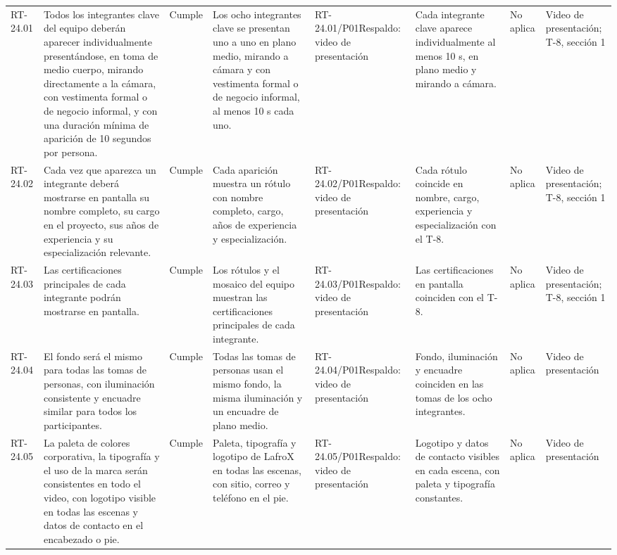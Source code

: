 \documentclass[oficio,firma,final]{lafrox}
\begin{document}
\begin{landscape}
{\begin{longtable}{@{}F{0.054} F{0.173} F{0.061} F{0.191} F{0.106} F{0.180} F{0.067} F{0.168}@{}}
  RT-24.01 & Todos los integrantes clave del equipo deberán aparecer individualmente presentándose, en toma de medio cuerpo, mirando directamente a la cámara, con vestimenta formal o de negocio informal, y con una duración mínima de aparición de 10 segundos por persona. & Cumple & Los ocho integrantes clave se presentan uno a uno en plano medio, mirando a cámara y con vestimenta formal o de negocio informal, al menos 10 s cada uno. & RT-24.01/\allowbreak{}P01\newline Respaldo: video de presentación & Cada integrante clave aparece individualmente al menos 10 s, en plano medio y mirando a cámara. & No aplica & Video de presentación; T-8, sección 1  \\
  RT-24.02 & Cada vez que aparezca un integrante deberá mostrarse en pantalla su nombre completo, su cargo en el proyecto, sus años de experiencia y su especialización relevante. & Cumple & Cada aparición muestra un rótulo con nombre completo, cargo, años de experiencia y especialización. & RT-24.02/\allowbreak{}P01\newline Respaldo: video de presentación & Cada rótulo coincide en nombre, cargo, experiencia y especialización con el T-8. & No aplica & Video de presentación; T-8, sección 1  \\
  RT-24.03 & Las certificaciones principales de cada integrante podrán mostrarse en pantalla. & Cumple & Los rótulos y el mosaico del equipo muestran las certificaciones principales de cada integrante. & RT-24.03/\allowbreak{}P01\newline Respaldo: video de presentación & Las certificaciones en pantalla coinciden con el T-8. & No aplica & Video de presentación; T-8, sección 1  \\
  RT-24.04 & El fondo será el mismo para todas las tomas de personas, con iluminación consistente y encuadre similar para todos los participantes. & Cumple & Todas las tomas de personas usan el mismo fondo, la misma iluminación y un encuadre de plano medio. & RT-24.04/\allowbreak{}P01\newline Respaldo: video de presentación & Fondo, iluminación y encuadre coinciden en las tomas de los ocho integrantes. & No aplica & Video de presentación  \\
  RT-24.05 & La paleta de colores corporativa, la tipografía y el uso de la marca serán consistentes en todo el video, con logotipo visible en todas las escenas y datos de contacto en el encabezado o pie. & Cumple & Paleta, tipografía y logotipo de LafroX en todas las escenas, con sitio, correo y teléfono en el pie. & RT-24.05/\allowbreak{}P01\newline Respaldo: video de presentación & Logotipo y datos de contacto visibles en cada escena, con paleta y tipografía constantes. & No aplica & Video de presentación  \\

\end{longtable}}
\end{landscape}
\end{document}

